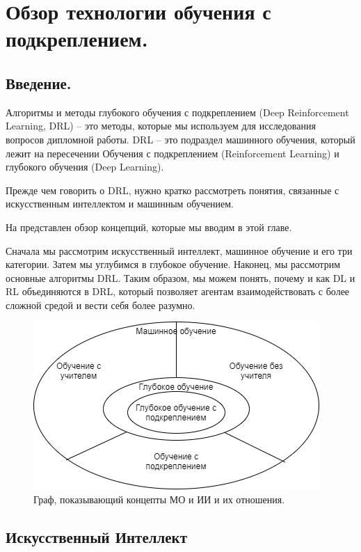 \chapter{Обзор технологии обучения с подкреплением.} \label{ch1}

\section{Введение.} \label{ch1:intro}

Алгоритмы и методы глубокого обучения с подкреплением (Deep Reinforcement Learning, DRL) – это методы, которые мы используем для исследования вопросов дипломной работы. DRL – это подраздел машинного обучения, который лежит на пересечении Обучения с подкреплением (Reinforcement Learning) и глубокого обучения (Deep Learning). 

Прежде чем говорить о DRL, нужно кратко рассмотреть понятия, связанные с искусственным интеллектом и машинным обучением.

На  представлен обзор концепций, которые мы вводим в этой главе. 

Сначала мы рассмотрим искусственный интеллект, машинное обучение и его три категории. Затем мы углубимся в глубокое обучение. Наконец, мы рассмотрим основные алгоритмы DRL.
Таким образом, мы можем понять, почему и как DL и RL объединяются в DRL, который позволяет агентам взаимодействовать с более сложной средой и вести себя более разумно.

\begin{figure}[ht!] 
	\center
	\includegraphics [scale=0.80] {my_folder/images/ch1/ML-and-AI-concepts.png}
	\caption{Граф, показывающий концепты МО и ИИ и их отношения.} 
	\label{fig:ch1-ML-and-AI-concepts}  
\end{figure}

\section{Искусственный Интеллект} \label{ch1:ai}

